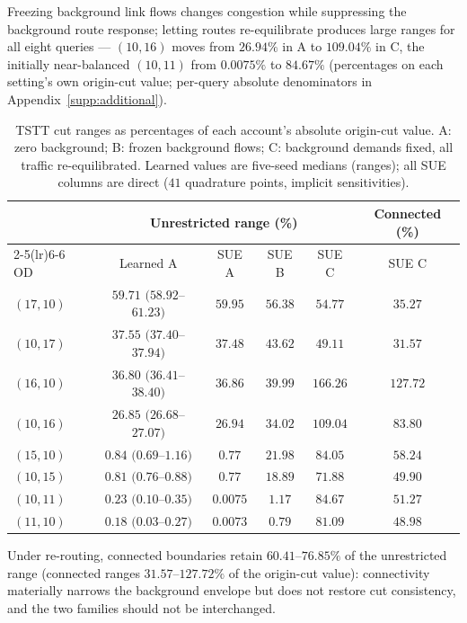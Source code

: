 Freezing background link flows changes congestion while suppressing
the background route response; letting routes re-equilibrate
produces large ranges for all eight queries --- $(10,16)$ moves from
$26.94\%$ in A to $109.04\%$ in C, the initially near-balanced
$(10,11)$ from $0.0075\%$ to $84.67\%$ (percentages on each
setting's own origin-cut value; per-query absolute denominators in
Appendix~\ref{supp:additional}).

\begin{table}[pos=htbp]
\caption{TSTT cut ranges as percentages of each account's absolute
origin-cut value. A: zero background; B: frozen background flows;
C: background demands fixed, all traffic re-equilibrated. Learned
values are five-seed medians (ranges); all SUE columns are direct
($41$ quadrature points, implicit sensitivities).}
\label{tab:cutspreadperod}
\small
\begin{tabular*}{\tblwidth}{@{\extracolsep{\fill}}lccccc}
\toprule
& \multicolumn{4}{c}{Unrestricted range (\%)} & Connected (\%)\\
\cmidrule(lr){2-5}\cmidrule(lr){6-6}
OD & Learned A & SUE A & SUE B & SUE C & SUE C\\
\midrule
$(17,10)$ & $59.71$ $(58.92$--$61.23)$ & $59.95$ & $56.38$ & $54.77$ & $35.27$ \\
$(10,17)$ & $37.55$ $(37.40$--$37.94)$ & $37.48$ & $43.62$ & $49.11$ & $31.57$ \\
$(16,10)$ & $36.80$ $(36.41$--$38.40)$ & $36.86$ & $39.99$ & $166.26$ & $127.72$ \\
$(10,16)$ & $26.85$ $(26.68$--$27.07)$ & $26.94$ & $34.02$ & $109.04$ & $83.80$ \\
$(15,10)$ & $0.84$ $(0.69$--$1.16)$ & $0.77$ & $21.98$ & $84.05$ & $58.24$ \\
$(10,15)$ & $0.81$ $(0.76$--$0.88)$ & $0.77$ & $18.89$ & $71.88$ & $49.90$ \\
$(10,11)$ & $0.23$ $(0.10$--$0.35)$ & $0.0075$ & $1.17$ & $84.67$ & $51.27$ \\
$(11,10)$ & $0.18$ $(0.03$--$0.27)$ & $0.0073$ & $0.79$ & $81.09$ & $48.98$ \\
\bottomrule
\end{tabular*}
\end{table}
Under re-routing, connected boundaries retain $60.41$--$76.85\%$ of
the unrestricted range (connected ranges $31.57$--$127.72\%$ of the
origin-cut value): connectivity materially narrows the background
envelope but does not restore cut consistency, and the two families
should not be interchanged.


